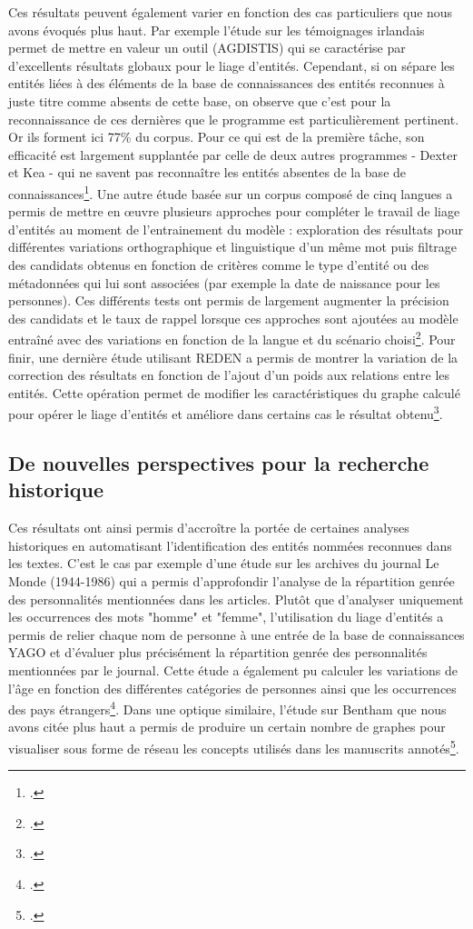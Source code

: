 \documentclass[a4paper,12pt,twoside]{book}
\begin{document}
	Ces résultats peuvent également varier en fonction des cas particuliers que nous avons évoqués plus haut. Par exemple l'étude sur les témoignages irlandais permet de mettre en valeur un outil (AGDISTIS) qui se caractérise par d'excellents résultats globaux pour le liage d'entités. Cependant, si on sépare les entités liées à des éléments de la base de connaissances des entités reconnues à juste titre comme absents de cette base, on observe que c'est pour la reconnaissance de ces dernières que le programme est particulièrement pertinent. Or ils forment ici 77\% du corpus. Pour ce qui est de la première tâche, son efficacité est largement supplantée par celle de deux autres programmes - Dexter et Kea - qui ne savent pas reconnaître les entités absentes de la base de connaissances\footcite{munnelly_investigating_2018}. Une autre étude basée sur un corpus composé de cinq langues a permis de mettre en œuvre plusieurs approches pour compléter le travail de liage d'entités au moment de l'entrainement du modèle : exploration des résultats pour différentes variations orthographique et linguistique d'un même mot puis filtrage des candidats obtenus en fonction de critères comme le type d'entité ou des métadonnées qui lui sont associées (par exemple la date de naissance pour les personnes). Ces différents tests ont permis de largement augmenter la précision des candidats et le taux de rappel lorsque ces approches sont ajoutées au modèle entraîné avec des variations en fonction de la langue et du scénario choisi\footcite{pontes_entity_2020}. Pour finir, une dernière étude utilisant REDEN a permis de montrer la variation de la correction des résultats en fonction de l'ajout d'un poids aux relations entre les entités. Cette opération permet de modifier les caractéristiques du graphe calculé pour opérer le liage d'entités et améliore dans certains cas le résultat obtenu\footcite{morzy_disambiguation_2015}.
	
	\subsection{De nouvelles perspectives pour la recherche historique}
	
	Ces résultats ont ainsi permis d'accroître la portée de certaines analyses historiques en automatisant l'identification des entités nommées reconnues dans les textes. C'est le cas par exemple d'une étude sur les archives du journal Le Monde (1944-1986) qui a permis d'approfondir l'analyse de la répartition genrée des personnalités mentionnées dans les articles. Plutôt que d'analyser uniquement les occurrences des mots "homme" et "femme", l'utilisation du liage d'entités a permis de relier chaque nom de personne à une entrée de la base de connaissances YAGO et d'évaluer plus précisément la répartition genrée des personnalités mentionnées par le journal. Cette étude a également pu calculer les variations de l'âge en fonction des différentes catégories de personnes ainsi que les occurrences des pays étrangers\footcite{huet_mining_2013}. Dans une optique similaire, l'étude sur Bentham que nous avons citée plus haut a permis de produire un certain nombre de graphes pour visualiser sous forme de réseau les concepts utilisés dans les manuscrits annotés\footcite{ruiz_mapping_2019}. 
	
\end{document}
